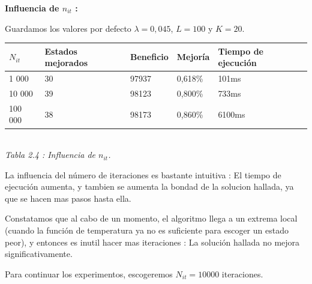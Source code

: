 \documentclass{article}
\begin{document}
\textbf{Influencia de $n_{it}$ : }

Guardamos los valores por defecto $\lambda =0,045$, $L=100$ y $K=20$.

\begin{center}
\begin{tabular}{|l||l|l|l|l|}
\hline
$N_{it}$ & Estados mejorados & Beneficio & Mejoría & Tiempo de ejecución\\
\hline
1 000 & 30 & 97937 & 0,618\% & 101ms\\
\hline
10 000 & 39 & 98123 & 0,800\% & 733ms\\
\hline
100 000 & 38 & 98173 & 0,860\% & 6100ms\\
\hline
\end{tabular}\\
{\it Tabla 2.4 : Influencia de $n_{it}$.}
\end{center}

La influencia del número de iteraciones es bastante intuitiva : El tiempo de
ejecución aumenta, y tambien se aumenta la bondad de la solucion hallada, ya que
se hacen mas pasos hasta ella.

Constatamos que al cabo de un momento, el algoritmo llega a un extrema local
(cuando la función de temperatura ya no es suficiente para escoger un estado
peor), y entonces es inutil hacer mas iteraciones : La solución hallada no
mejora significativamente.

Para continuar los experimentos, escogeremos $N_{it}=10 000$ iteraciones.\\
\end{document}
